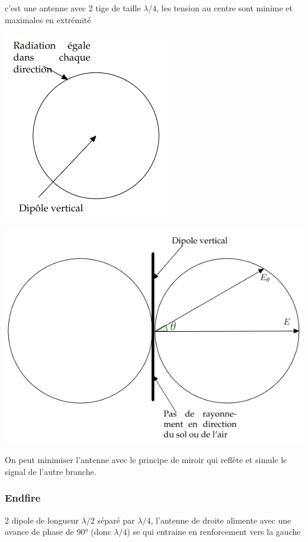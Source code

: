 		c'est une antenne avec 2 tige de taille $\lambda /4$, les tension au centre sont minime et maximales en extrémité
	
		\begin{minipage}{.6\textwidth}
  \centering
  \includegraphics[width=.5\textwidth]{img/dipole1.png}

\end{minipage}%
\begin{minipage}{.5\textwidth}
  \centering
  \includegraphics[width=.8\textwidth]{img/dipole2.png}

\end{minipage}
\begin{minipage}{.5\textwidth}
  \centering
\end{minipage}
		On peut minimiser l'antenne avec le principe de miroir qui reflète et simule le signal de l'autre branche.
		
	\subsubsection{Endfire}
		2 dipole de longueur $\lambda/2$ séparé par $\lambda/4$, l'antenne de droite alimente avec une avance de phase de 90° (donc $\lambda/4$) se qui entraine en renforcement vers la gauche
		
